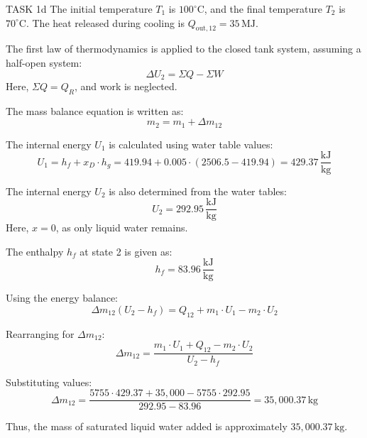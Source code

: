 TASK 1d  
The initial temperature \( T_1 \) is \( 100^\circ\text{C} \), and the final temperature \( T_2 \) is \( 70^\circ\text{C} \). The heat released during cooling is \( Q_{\text{out},12} = 35 \, \text{MJ} \).  

The first law of thermodynamics is applied to the closed tank system, assuming a half-open system:  
\[
\Delta U_2 = \Sigma Q - \Sigma W
\]  
Here, \( \Sigma Q = Q_R \), and work is neglected.  

The mass balance equation is written as:  
\[
m_2 = m_1 + \Delta m_{12}
\]  

The internal energy \( U_1 \) is calculated using water table values:  
\[
U_1 = h_f + x_D \cdot h_g = 419.94 + 0.005 \cdot (2506.5 - 419.94) = 429.37 \, \frac{\text{kJ}}{\text{kg}}
\]  

The internal energy \( U_2 \) is also determined from the water tables:  
\[
U_2 = 292.95 \, \frac{\text{kJ}}{\text{kg}}
\]  
Here, \( x = 0 \), as only liquid water remains.  

The enthalpy \( h_f \) at state 2 is given as:  
\[
h_f = 83.96 \, \frac{\text{kJ}}{\text{kg}}
\]  

Using the energy balance:  
\[
\Delta m_{12} (U_2 - h_f) = Q_{12} + m_1 \cdot U_1 - m_2 \cdot U_2
\]  

Rearranging for \( \Delta m_{12} \):  
\[
\Delta m_{12} = \frac{m_1 \cdot U_1 + Q_{12} - m_2 \cdot U_2}{U_2 - h_f}
\]  

Substituting values:  
\[
\Delta m_{12} = \frac{5755 \cdot 429.37 + 35,000 - 5755 \cdot 292.95}{292.95 - 83.96} = 35,000.37 \, \text{kg}
\]  

Thus, the mass of saturated liquid water added is approximately \( 35,000.37 \, \text{kg} \).